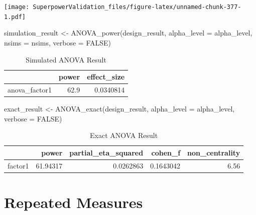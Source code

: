 \documentclass[
]{book}
\newenvironment{Shaded}{\begin{snugshade}}{\end{snugshade}}
\newcommand{\AttributeTok}[1]{\textcolor[rgb]{0.77,0.63,0.00}{#1}}
\newcommand{\ConstantTok}[1]{\textcolor[rgb]{0.00,0.00,0.00}{#1}}
\newcommand{\FunctionTok}[1]{\textcolor[rgb]{0.00,0.00,0.00}{#1}}
\newcommand{\NormalTok}[1]{#1}
\newcommand{\OtherTok}[1]{\textcolor[rgb]{0.56,0.35,0.01}{#1}}
\begin{document}
\texttt{[image: SuperpowerValidation\_files/figure-latex/unnamed-chunk-377-1.pdf]}

\begin{Shaded}
\begin{Highlighting}[]
\NormalTok{simulation\_result }\OtherTok{\textless{}{-}} \FunctionTok{ANOVA\_power}\NormalTok{(design\_result, }
                                 \AttributeTok{alpha\_level =}\NormalTok{ alpha\_level, }
                                 \AttributeTok{nsims =}\NormalTok{ nsims,}
                                 \AttributeTok{verbose =} \ConstantTok{FALSE}\NormalTok{)}
\end{Highlighting}
\end{Shaded}

\begin{table}[!h]

\caption{\label{tab:unnamed-chunk-379}Simulated ANOVA Result}
\centering
\begin{tabular}[t]{l|r|r}
\hline
  & power & effect\_size\\
\hline
anova\_factor1 & 62.9 & 0.0340814\\
\hline
\end{tabular}
\end{table}

\begin{Shaded}
\begin{Highlighting}[]
\NormalTok{exact\_result }\OtherTok{\textless{}{-}} \FunctionTok{ANOVA\_exact}\NormalTok{(design\_result,}
                            \AttributeTok{alpha\_level =}\NormalTok{ alpha\_level,}
                            \AttributeTok{verbose =} \ConstantTok{FALSE}\NormalTok{)}
\end{Highlighting}
\end{Shaded}

\begin{table}[!h]

\caption{\label{tab:unnamed-chunk-381}Exact ANOVA Result}
\centering
\begin{tabular}[t]{l|r|r|r|r}
\hline
  & power & partial\_eta\_squared & cohen\_f & non\_centrality\\
\hline
factor1 & 61.94317 & 0.0262863 & 0.1643042 & 6.56\\
\hline
\end{tabular}
\end{table}

\hypertarget{repeated-measures}{%
\section{Repeated Measures}\label{repeated-measures}}
\end{document}
